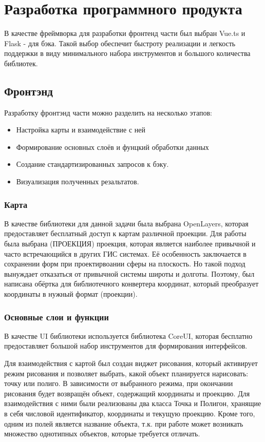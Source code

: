 \chapter{Разработка программного продукта}
В качестве фреймворка для разработки фронтенд части был выбран Vue.ts и Flask - для бэка. Такой выбор обеспечит быстроту реализации и легкость поддержки в виду минимального набора инструментов и большого количества библиотек.

\section{Фронтэнд}
Разработку фронтэнд части можно разделить на несколько этапов:
\begin{itemize}
	\item Настройка карты и взаимодействие с ней
	\item Формирование основных слоёв и фунцкий обработки данных
	\item Создание стандартизированных запросов к бэку.
	\item Визуализация полученных резальтатов.
\end{itemize}

\subsection*{Карта}
В качестве библиотеки для данной задачи была выбрана OpenLayers, которая предоставляет бесплатный доступ к картам различной проекции.
Для работы была выбрана (ПРОЕКЦИЯ) проекция, которая является наиболее привычной и часто встречающийся в других ГИС системах. Её особенность заключается в сохранении форм при проектирвоании сферы на плоскость. Но такой подход вынуждает отказаться от привычной системы широты и долготы. Поэтому, был написана обёртка для библиотечного  конвертера координат, который преобразует координаты в нужный формат (проекции).

\subsection*{Основные слои и функции}
В качестве UI библиотеки используется библиотека CoreUI, которая бесплатно предоставляет большой набор инструментов для формирования интерфейсов.

Для взаимодействия с картой был создан виджет рисования, который активирует режим рисования и позволяет выбрать, какой объект планируется нарисовать: точку или полиго. В зависимости от выбранного режима, при окончании рисования будет возвращён объект, содержащий координаты и проекцию. Для взаимодействия с ними были реализованы два класса Точка и Полигон, хранящие в себя числовой идентификатор, координаты и текущую проекцию. Кроме того, одним из полей является название объекта, т.к. при работе может возникать множество однотипных объектов, которые требуется отличать.


